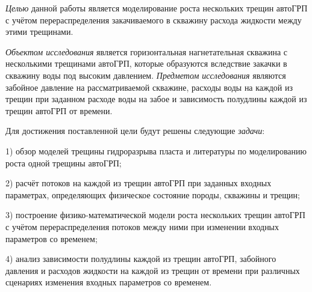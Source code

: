 \emph{Целью} данной работы является моделирование роста нескольких трещин автоГРП с учётом перераспределения закачиваемого в скважину расхода жидкости между этими трещинами.

\emph{Объектом исследования} является горизонтальная нагнетательная скважина с несколькими трещинами автоГРП, которые образуются вследствие закачки в скважину воды под высоким давлением. 
\emph{Предметом исследования} являются забойное давление на рассматриваемой скважине, расходы воды на каждой из трещин при заданном расходе воды на забое и зависимость полудлины каждой из трещин автоГРП от времени.

Для достижения поставленной цели будут решены следующие \emph{задачи}:

1) обзор моделей трещины гидроразрыва пласта и литературы по моделированию роста одной трещины автоГРП;

2) расчёт потоков на каждой из трещин автоГРП при заданных входных параметрах, определяющих физическое состояние породы, скважины и трещин;

3) построение физико-математической модели роста нескольких трещин автоГРП с учётом перераспределения потоков между ними при изменении входных параметров со временем;

4) анализ зависимости полудлины каждой из трещин автоГРП, забойного давления и расходов жидкости на каждой из трещин от времени при различных сценариях изменения входных параметров со временем.

